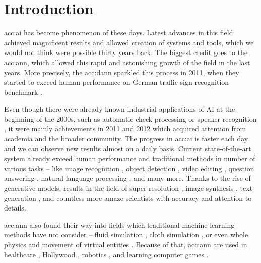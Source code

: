 \chapter{Introduction}

\acrfull{acc:ai} has become phenomenon of these days. Latest advances in this field achieved magnificent results and allowed creation of systems and tools, which we would not think were possible thirty years back. The biggest credit goes to the \acrfull{acc:ann}, which allowed this rapid and astonishing growth of the field in the last years. More precisely, the \acrfull{acc:dann} sparkled this process in 2011, when they started to exceed human performance on German traffic sign recognition benchmark \citep{CIRESAN2012333}.

Even though there were already known industrial applications of AI at the beginning of the 2000s, such as automatic check processing \citep{ChecksDocumentRecognition} or speaker recognition \citep{HECK2000181}, it were mainly achievements in 2011 and 2012 which acquired attention from academia and the broader community. The progress in \acrshort{acc:ai} is faster each day and we can observe new results almost on a daily basis. Current state-of-the-art system already exceed human performance and traditional methods in number of various tasks -- like 
image recognition \citep{pham2021meta}\citep{ZawadzkaGosk2019},
object detection \citep{ghiasi2020simple}\citep{lehner2019patch},
video editing \citep{lu2020layered},
question answering \citep{yamada2020luke}\citep{yamada2020luke},
natural language processing \citep{gpt3},
and many more. Thanks to the rise of generative models, results in the field of
super-resolution \citep{Sun_2020}\allowbreak\citep{Chadha_2020},
image synthesis \citep{StateOfTheArtImageSythesis}\allowbreak\citep{esser2020taming}\allowbreak\citep{dalle},
text generation \citep{gpt3}\allowbreak\citep{malmi2019encode},
and countless more amaze scientists with accuracy and attention to details.

\acrshort{acc:ann} also found their way into fields which traditional machine learning methods have not consider -- fluid simulation \citep{um2018liquid}\citep{Kim_2019}, cloth simulation \citep{lee2019efficient}\citep{SRBO20}, or even whole physics \citep{PhysicsSimulation}\citep{sanchezgonzalez2020learning} and movement of virtual entities \citep{PhysicsBasedCharaterSImulation}\citep{zhang2020vid2player}. Because of that, \acrshort{acc:ann} are used in 
healthcare \citep{fakoor2013using}\allowbreak\citep{BreastCancerAISystem},
Hollywood \citep{aiinhollywood},
robotics \citep{pierson2017deep}\allowbreak\citep{Lee_2020},
and learning computer games \citep{openai2019dota}\allowbreak\citep{alphastar}.

